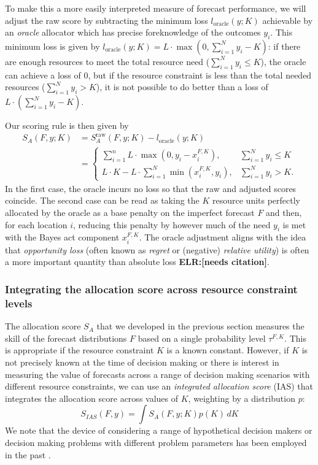 \documentclass{article}\usepackage[]{graphicx}\usepackage[]{xcolor}
\def\elr#1{{\color{cyan}\textbf{ELR:[#1]}}}
\begin{document}
To make this a more easily interpreted measure of forecast performance, we will adjust the raw score by subtracting the minimum loss $l_{\text{oracle}}(y;K)$ achievable by an \emph{oracle} allocator which has precise foreknowledge of the outcomes $y_i$.
This minimum loss is given by $l_{\text{oracle}}(y;K) = L \cdot \max(0, \sum_{i=1}^{N}y_i - K)$: if there are enough resources to meet the total resource need ($\sum_{i=1}^{N}y_i \leq K$), the oracle can achieve a loss of 0, but if the resource constraint is less than the total needed resources ($\sum_{i=1}^{N}y_i > K$), it is not possible to do better than a loss of $L \cdot (\sum_{i=1}^{N}y_i - K)$.

Our scoring rule is then given by
\begin{align}
S_A(F, y; K) &= S_A^{\text{raw}}(F, y; K) - l_{\text{oracle}}(y;K) \\
& =
\begin{cases}
\sum_{i=1}^n L  \cdot  \max(0, y_i - x_i^{F,K}), &  \sum_{i=1}^{N}y_i \leq K \\
L \cdot K - L \cdot \sum_{i=1}^{N} \min(x_i^{F,K}, y_i), &  \sum_{i=1}^{N}y_i > K.
\end{cases}
\end{align}
In the first case, the oracle incurs no loss so that the raw and adjusted scores coincide. The second case can be read as taking the $K$ resource units perfectly allocated by the oracle as a base penalty on
the imperfect forecast $F$ and then, for each location $i$, reducing this penalty by however much of the need $y_i$
is met with the Bayes act component $x_i^{F,K}$.
The oracle adjustment aligns with the idea that \emph{opportunity loss} (often known as \emph{regret} or (negative) \emph{relative utility}) is often a more important quantity than absolute loss \elr{needs citation}.

\subsubsection{Integrating the allocation score across resource constraint levels}
\label{sec:methods.detailed.integrated_allocation}

The allocation score $S_A$ that we developed in the previous section measures the skill of the forecast distributions $F$ based on a single probability level $\tau^{F,K}$. This is appropriate if the resource constraint $K$ is a known constant. However, if $K$ is not precisely known at the time of decision making or there is interest in measuring the value of forecasts across a range of decision making scenarios with different resource constraints, we can use an \emph{integrated allocation score} (IAS) that integrates the allocation score across values of $K$, weighting by a distribution $p$:
$$S_{IAS}(F, y) = \int S_A(F,y; K) p(K) \, dK$$
We note that the device of considering a range of hypothetical decision makers or decision making problems with different problem parameters has been employed in the past \cite[e.g.,][]{murphy1993whatisagoodforecast}.
\end{document}
